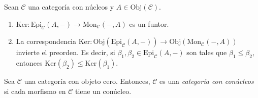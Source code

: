 \documentclass[tesis]{subfiles}
\begin{document}
\begin{Obs}\label{Mendoza-1.5.10}
    Sean $\mathscr{C}$ una categoría con núcleos y $A\in\text{Obj}(\mathscr{C})$. 

    \begin{enumerate}[label=(\arabic*)]
    
        \item $\text{Ker}:\text{Epi}_\mathscr{C}(A,-)\to \text{Mon}_\mathscr{C}(-,A)$ es un funtor.

        \item La correspondencia $\text{Ker}:\text{Obj}(\text{Epi}_\mathscr{C}(A,-)) \to \text{Obj}(\text{Mon}_\mathscr{C}(-,A))$ invierte el preorden. Es decir, si $\beta_1,\beta_2\in\text{Epi}_\mathscr{C}(A,-)$ son tales que $\beta_1\le\beta_2$, entonces $\text{Ker}(\beta_2)\le\text{Ker}(\beta_1)$.
    \end{enumerate}
\end{Obs}

\begin{Def}\label{Categoría con conúcleos}
    Sea $\mathscr{C}$ una categoría con objeto cero. Entonces, $\mathscr{C}$ es una \emph{categoría con conúcleos} si cada morfismo en $\mathscr{C}$ tiene un conúcleo.
\end{Def}
\end{document}
